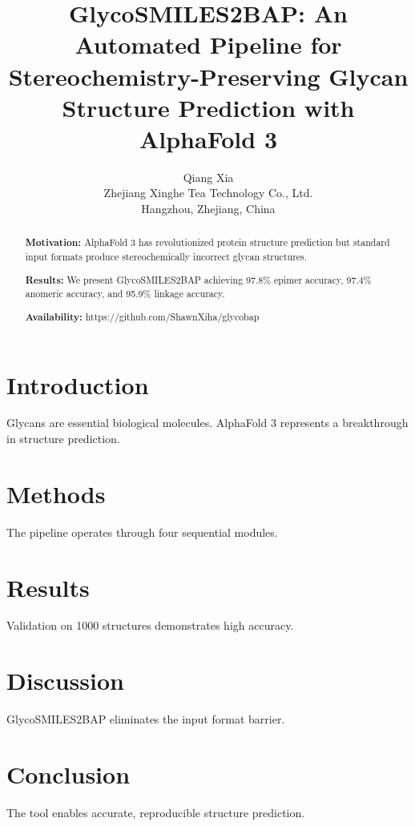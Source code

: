 \documentclass[11pt,a4paper]{article}
\title{\textbf{GlycoSMILES2BAP: An Automated Pipeline for Stereochemistry-Preserving Glycan Structure Prediction with AlphaFold 3}}
\author{Qiang Xia\\Zhejiang Xinghe Tea Technology Co., Ltd.\\Hangzhou, Zhejiang, China}
\date{}
\begin{document}
\maketitle

\begin{abstract}
\noindent\textbf{Motivation:} AlphaFold 3 has revolutionized protein structure prediction but standard input formats produce stereochemically incorrect glycan structures.

\noindent\textbf{Results:} We present GlycoSMILES2BAP achieving 97.8\% epimer accuracy, 97.4\% anomeric accuracy, and 95.9\% linkage accuracy.

\noindent\textbf{Availability:} https://github.com/ShawnXiha/glycobap
\end{abstract}

\section{Introduction}
Glycans are essential biological molecules. AlphaFold 3 represents a breakthrough in structure prediction.

\section{Methods}
The pipeline operates through four sequential modules.

\section{Results}
Validation on 1000 structures demonstrates high accuracy.

\section{Discussion}
GlycoSMILES2BAP eliminates the input format barrier.

\section{Conclusion}
The tool enables accurate, reproducible structure prediction.



\end{document}
